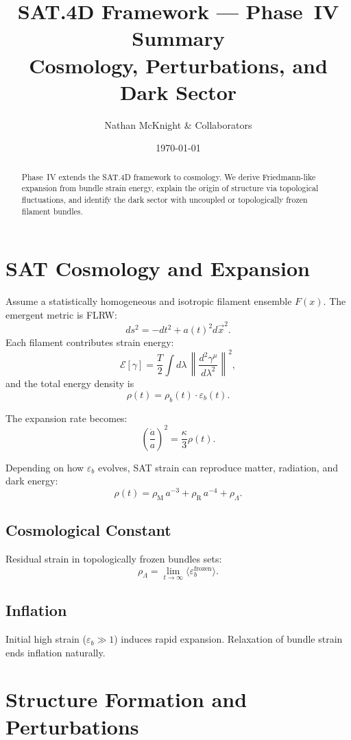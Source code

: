 \documentclass[11pt]{article}
\title{\textbf{SAT.4D Framework --- Phase~IV Summary}\\Cosmology, Perturbations, and Dark Sector}
\author{Nathan McKnight \& Collaborators}
\date{\today}
\begin{document}
\maketitle

\begin{abstract}
Phase~IV extends the SAT.4D framework to cosmology. We derive Friedmann-like
expansion from bundle strain energy, explain the origin of structure via topological
fluctuations, and identify the dark sector with uncoupled or topologically frozen
filament bundles.
\end{abstract}

\tableofcontents

\section{SAT Cosmology and Expansion}

Assume a statistically homogeneous and isotropic filament ensemble \( F(x) \).  
The emergent metric is FLRW:
\[
ds^2 = -dt^2 + a(t)^2 d\vec{x}^2.
\]
Each filament contributes strain energy:
\[
\mathcal E[\gamma] = \frac{T}{2} \int d\lambda\, \left\| \frac{d^2\gamma^\mu}{d\lambda^2} \right\|^2,
\]
and the total energy density is
\[
\rho(t) = \rho_b(t) \cdot \varepsilon_b(t).
\]

The expansion rate becomes:
\[
\left(\frac{\dot a}{a}\right)^2 = \frac{\kappa}{3} \rho(t).
\]

Depending on how \( \varepsilon_b \) evolves, SAT strain can reproduce matter, radiation, and dark energy:
\[
\rho(t) = \rho_{\text{M}}\,a^{-3} + \rho_{\text{R}}\,a^{-4} + \rho_\Lambda.
\]

\subsection{Cosmological Constant}
Residual strain in topologically frozen bundles sets:
\[
\rho_\Lambda = \lim_{t\to\infty} \langle \varepsilon_b^{\text{frozen}} \rangle.
\]

\subsection{Inflation}
Initial high strain (\( \varepsilon_b \gg 1 \)) induces rapid expansion.
Relaxation of bundle strain ends inflation naturally.

\section{Structure Formation and Perturbations}
\end{document}
